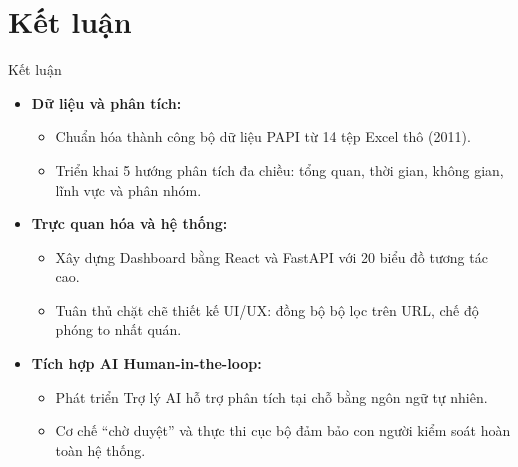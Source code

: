 \section{Kết luận}

\begin{frame}[t]{Kết luận}
  \begin{itemize}
    \setlength{\itemsep}{8pt}
    \item \textbf{Dữ liệu và phân tích:}
    \begin{itemize}
      \item Chuẩn hóa thành công bộ dữ liệu PAPI từ 14 tệp Excel thô (2011).
      \item Triển khai 5 hướng phân tích đa chiều: tổng quan, thời gian, không gian, lĩnh vực và phân nhóm.
    \end{itemize}
    \item \textbf{Trực quan hóa và hệ thống:}
    \begin{itemize}
      \item Xây dựng Dashboard bằng React và FastAPI với 20 biểu đồ tương tác cao.
      \item Tuân thủ chặt chẽ thiết kế UI/UX: đồng bộ bộ lọc trên URL, chế độ phóng to nhất quán.
    \end{itemize}
    \item \textbf{Tích hợp AI Human-in-the-loop:}
    \begin{itemize}
      \item Phát triển Trợ lý AI hỗ trợ phân tích tại chỗ bằng ngôn ngữ tự nhiên.
      \item Cơ chế ``chờ duyệt'' và thực thi cục bộ đảm bảo con người kiểm soát hoàn toàn hệ thống.
    \end{itemize}
  \end{itemize}
\end{frame}

